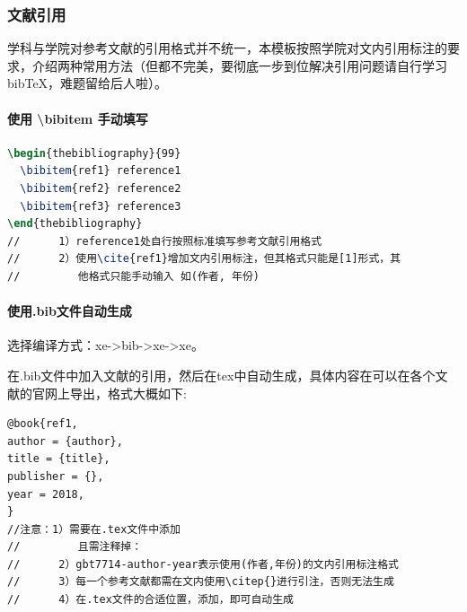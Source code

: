 \documentclass[AutoFakeBold]{ZafuThesis}
\begin{document}
\subsubsection{文献引用}
学科与学院对参考文献的引用格式并不统一，本模板按照学院对文内引用标注的要求，介绍两种常用方法（但都不完美，要彻底一步到位解决引用问题请自行学习bibTeX，难题留给后人啦）。
\paragraph{使用 \textbackslash bibitem 手动填写}

\begin{lstlisting}[language = tex]
\begin{thebibliography}{99}
  \bibitem{ref1} reference1 
  \bibitem{ref2} reference2
  \bibitem{ref3} reference3
\end{thebibliography}
//      1）reference1处自行按照标准填写参考文献引用格式
//      2）使用\cite{ref1}增加文内引用标注，但其格式只能是[1]形式，其
//         他格式只能手动输入 如(作者, 年份)
\end{lstlisting}

\paragraph{使用.bib文件自动生成}
选择编译方式：xe->bib->xe->xe。\par
在.bib文件中加入文献的引用，然后在tex中自动生成，具体内容在可以在各个文献的官网上导出，格式大概如下:
\begin{lstlisting} 
@book{ref1,
author = {author}, 
title = {title},
publisher = {},
year = 2018,
}
//注意：1）需要在.tex文件中添加
//         且需注释掉：
//      2）gbt7714-author-year表示使用(作者,年份)的文内引用标注格式
//      3）每一个参考文献都需在文内使用\citep{}进行引注，否则无法生成
//      4）在.tex文件的合适位置，添加，即可自动生成
\end{lstlisting}
\end{document}
